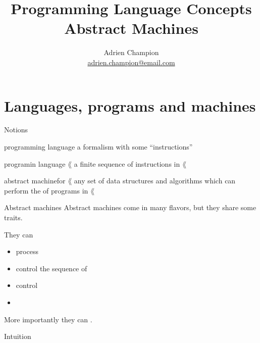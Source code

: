 \documentclass[10pt]{beamer}
\title{
  Programming Language Concepts\\[3em]
  Abstract Machines\\[2em]
}
\author[]{
  Adrien Champion\\
  \href{mailto:adrien.champion@email.com}{adrien.champion@email.com}
}
\date{}
\begin{document}
\addtolength{\leftmargin}{-20pt}
\addtolength{\rightmargin}{-20pt}



\begin{frame}{}
  \titlepage
\end{frame}



\section{Languages, programs and machines}


\begin{frame}[fragile]{Notions}
  \begin{define}{programming language}{}
    a formalism with some ``instructions''
  \end{define}

  \begin{define}{program}{in language $\lang$}%
    a finite sequence of instructions in $\lang$
  \end{define}
  \pause

  \begin{define}{abstract machine}{for $\lang$}
    any set of data structures and algorithms which can perform the
     of programs in $\lang$
  \end{define}
\end{frame}



\begin{frame}{Abstract machines}
  Abstract machines come in many flavors, but they share some traits.
  \bigskip

  They can
  \medskip
  \begin{itemize}
  \item process 
  \item control the sequence of 
  \item control 
  \item {}
  \end{itemize}
  \bigskip

  \pause

  More importantly they can .
\end{frame}




\begin{frame}{Intuition}
  

\end{frame}
\end{document}
